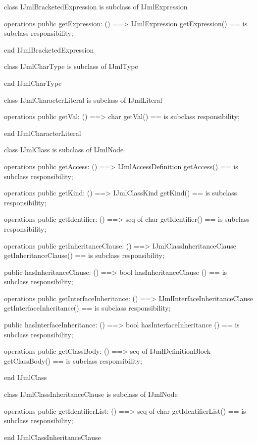 \begin{vdm_al}
class IJmlBracketedExpression
 is subclass of IJmlExpression

operations
  public getExpression: () ==> IJmlExpression
  getExpression() == is subclass responsibility;

end IJmlBracketedExpression
\end{vdm_al}

\begin{vdm_al}
class IJmlCharType
 is subclass of IJmlType

end IJmlCharType
\end{vdm_al}

\begin{vdm_al}
class IJmlCharacterLiteral
 is subclass of IJmlLiteral

operations
  public getVal: () ==> char
  getVal() == is subclass responsibility;

end IJmlCharacterLiteral
\end{vdm_al}

\begin{vdm_al}
class IJmlClass
 is subclass of IJmlNode

operations
  public getAccess: () ==> IJmlAccessDefinition
  getAccess() == is subclass responsibility;

operations
  public getKind: () ==> IJmlClassKind
  getKind() == is subclass responsibility;

operations
  public getIdentifier: () ==> seq of char
  getIdentifier() == is subclass responsibility;

operations
  public getInheritanceClause: () ==> IJmlClassInheritanceClause
  getInheritanceClause() == is subclass responsibility;

  public hasInheritanceClause: () ==> bool
  hasInheritanceClause () == is subclass responsibility;

operations
  public getInterfaceInheritance: () ==> IJmlInterfaceInheritanceClause
  getInterfaceInheritance() == is subclass responsibility;

  public hasInterfaceInheritance: () ==> bool
  hasInterfaceInheritance () == is subclass responsibility;

operations
  public getClassBody: () ==> seq of IJmlDefinitionBlock
  getClassBody() == is subclass responsibility;

end IJmlClass
\end{vdm_al}

\begin{vdm_al}
class IJmlClassInheritanceClause
 is subclass of IJmlNode

operations
  public getIdentifierList: () ==> seq of char
  getIdentifierList() == is subclass responsibility;

end IJmlClassInheritanceClause
\end{vdm_al}


